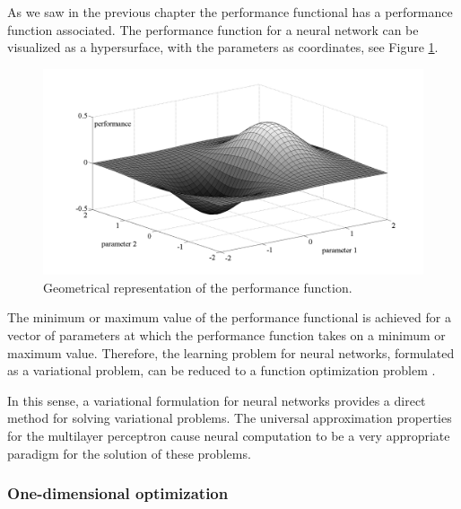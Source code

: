 As we saw in the previous chapter the performance functional has a performance
function associated. 
The performance function for a neural network can be visualized as a hypersurface,
with the parameters as coordinates, see Figure
\ref{PerformanceFunctionFigure}.

\begin{figure}[h!]
\begin{center}
\includegraphics[width=1.0\textwidth]{training_strategy/performance_function.png}
\caption{Geometrical representation of the performance function.}\label{PerformanceFunctionFigure}
\end{center}
\end{figure}

The minimum or maximum value of the performance functional is
achieved for a vector of parameters at which the performance
function takes on a minimum or maximum value. Therefore, the
learning problem for neural networks, formulated as a
variational problem, can be reduced to a function optimization
problem \cite{Lopez2006ICANN}.

In this sense, a variational formulation for neural networks provides a direct method for solving variational 
problems. The universal approximation 
properties for the multilayer perceptron cause neural computation to
be a very appropriate paradigm for the solution of these problems.

\subsubsection{One-dimensional optimization}



